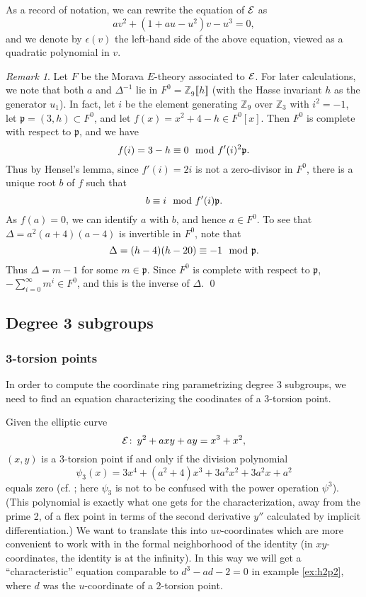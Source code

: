 \documentclass{gtpart}
\theoremstyle{definition}
\theoremstyle{remark}
\newtheorem{rmk}[thm]{Remark}
\def\co{\colon\thinspace}
\newcommand{\mb}[1]{\mathbb{#1}}
\newcommand{\mf}[1]{\mathfrak{#1}}
\begin{document}
As a record of notation, we can rewrite the equation of $\cal E$ as 
\[
 a v^2 + (1 + a u - u^2) v - u^3 = 0, 
\]
and we denote by $\epsilon(v)$ the left-hand side of the above equation, 
viewed as a quadratic polynomial in $v$.  

\begin{rmk}
\label{rmk:adelta}
 Let $F$ be the Morava $E$-theory associated to $\cal E$.  For later 
 calculations, we note that both $a$ and $\Delta^{-1}$ lie in 
 $F^0 = {\mb Z}_9 \llbracket h \rrbracket$ (with the Hasse invariant $h$ as 
 the generator $u_1$).  In fact, let $i$ be the element generating 
 ${\mb Z}_9$ over ${\mb Z}_3$ with $i^2 = -1$, let 
 $\mf p = (3,h) \subset F^0$, and let $f(x) = x^2 + 4 - h \in F^0 [x]$.  Then 
 $F^0$ is complete with respect to $\mf p$, and we have 
 \[
  f(i) = 3 - h \equiv 0~~{\rm mod}~f'(i)^2 {\mf p}.  
 \]
 Thus by Hensel's lemma, since $f'(i) = 2i$ is not a zero-divisor in $F^0$, 
 there is a unique root $b$ of $f$ such that 
 \[
  b \equiv i~~{\rm mod}~f'(i) {\mf p}.  
 \]
 As $f(a) = 0$, we can identify $a$ with $b$, and hence $a \in F^0$.  To see 
 that $\Delta = a^2(a+4)(a-4)$ is invertible in $F^0$, note that 
 \[
  \Delta = (h-4)(h-20) \equiv -1~~{\rm mod}~{\mf p}.  
 \]
 Thus $\Delta = m-1$ for some $m \in {\mf p}$.  Since $F^0$ is complete with 
 respect to $\mf p$, $-\sum_{i=0}^\infty m^i \in F^0$, and this is the inverse 
 of $\Delta$.  \qed
\end{rmk}


\subsection{Degree 3 subgroups}
\label{subsec:step2}

\subsubsection{3-torsion points}
\label{subsec}

In order to compute the coordinate ring parametrizing degree 3 subgroups, we 
need to find an equation characterizing the coodinates of a 3-torsion point.  

Given the elliptic curve 
\[
 {\cal E}\co y^2 + a x y + a y = x^3 + x^2, 
\]
$(x,y)$ is a 3-torsion point if and only if the division polynomial 
\[
 \psi_3 (x) = 3x^4 + (a^2 + 4) x^3 + 3a^2 x^2 + 3a^2 x + a^2 
\]
equals zero (cf. \cite[exercise 3.7(d)]{AEC}; here $\psi_3$ is not to be 
confused with the power operation $\psi^3$).  (This polynomial is exactly what 
one gets for the characterization, away from the prime 2, of a flex point in 
terms of the second derivative $y''$ calculated by implicit differentiation.)  
We want to translate this into $uv$-coordinates which are more convenient to 
work with in the formal neighborhood of the identity (in $xy$-coordinates, the 
identity is at the infinity).  In this way we will get a ``characteristic'' 
equation comparable to $d^3 - a d - 2 = 0$ in example \ref{ex:h2p2}, where $d$ 
was the $u$-coordinate of a 2-torsion point.  
\end{document}
